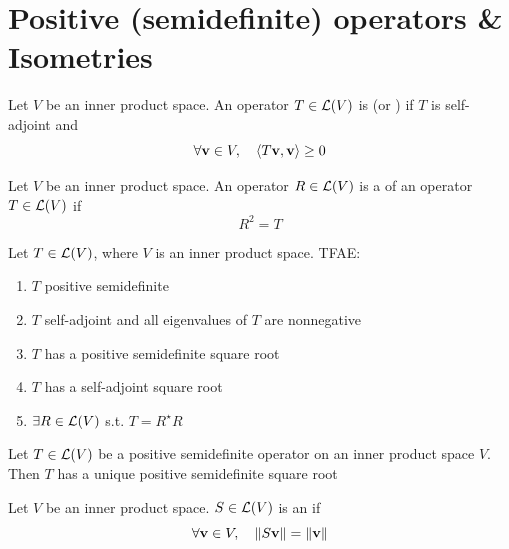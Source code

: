\documentclass[aspectratio=169]{beamer}
\begin{document}
\section{Positive (semidefinite) operators \& Isometries}

\begin{frame}
\begin{definition}
Let $V$ be an inner product space. An operator $T\in\mathcal{L}(V)$ is  (or ) if $T$ is self-adjoint and
\[
\forall\mathbf{v}\in V,\quad 
\langle T\mathbf{v},\mathbf{v}\rangle \geq 0
\]
\end{definition}
\vfill
\begin{definition}
Let $V$ be an inner product space. An operator $R\in\mathcal{L}(V)$ is a  of an operator $T\in\mathcal{L}(V)$ if
\[
R^2=T
\]
\end{definition}
\end{frame}


\begin{frame}
\begin{importanttheorem}
Let $T\in\mathcal{L}(V)$, where $V$ is an inner product space. TFAE:
\begin{enumerate}
\item $T$ positive semidefinite
\item $T$ self-adjoint and all eigenvalues of $T$ are nonnegative
\item $T$ has a positive semidefinite square root
\item $T$ has a self-adjoint square root
\item $\exists R\in\mathcal{L}(V)$ s.t. $T=R^\star R$
\end{enumerate}
\end{importanttheorem}
\vfill
\begin{theorem}
Let $T\in\mathcal{L}(V)$ be a positive semidefinite operator on an inner product space $V$. Then $T$ has a unique positive semidefinite square root
\end{theorem}
\end{frame}


\begin{frame}
\begin{definition}[Isometry]
Let $V$ be an inner product space. $S\in\mathcal{L}(V)$ is an  if
\[
\forall\mathbf{v}\in V,\quad \|S\mathbf{v}\|=\|\mathbf{v}\|
\]
\end{definition}
\end{frame}
\end{document}
